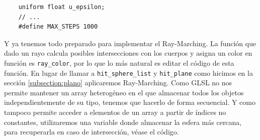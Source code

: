 \begin{lstlisting}
    uniform float u_epsilon;
    // ... 
    #define MAX_STEPS 1000
\end{lstlisting}

Y ya tenemos todo preparado para implementar el Ray-Marching. La función que dado un rayo calcula posibles intersecciones con los cuerpos y asigna un color en función es \verb|ray_color|, por lo que lo más natural es editar el código de esta función. En lugar de llamar a \verb|hit_sphere_list| y \verb|hit_plane| como hicimos en la sección \ref{subsection:plano} aplicaremos Ray-Marching. Como GLSL no nos permite mantener un array heterogéneo en el que almacenar todos los objetos independientemente de su tipo, tenemos que hacerlo de forma secuencial. Y como tampoco permite acceder a elementos de un array a partir de índices no constantes, utilizaremos una variable donde almacenar la esfera más cercana, para recuperarla en caso de intersección, véase el código.

